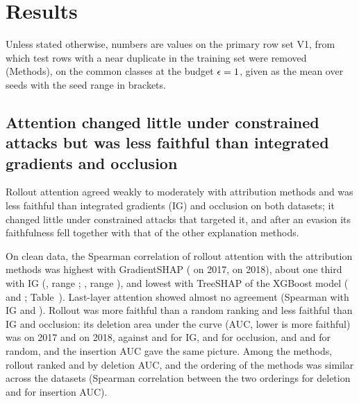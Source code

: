 \section*{Results}
\label{sec:results}

Unless stated otherwise, numbers are values on the primary row set V1, from which test rows with a near duplicate in
the training set were removed (Methods), on the \nCommonClasses{} common classes at the budget
$\epsilon = 1$, given as the mean over \nSeeds{} seeds with the seed range in brackets.

\subsection*{Attention changed little under constrained attacks but was less faithful than integrated gradients and
occlusion}
\label{sec:rq1}
Rollout attention agreed weakly to moderately with attribution methods and was less faithful than integrated gradients
(IG) and occlusion on both datasets; it changed little under constrained attacks that targeted it, and after an evasion
its faithfulness fell together with that of the other explanation methods.

On clean data, the Spearman correlation of rollout attention with the attribution methods was highest with
GradientSHAP (\spRolloutGShapVoneSeventeen{} on 2017, \spRolloutGShapVoneEighteen{} on 2018), about one third with IG
(\spRolloutIGVoneSeventeen{}, range \spRolloutIGVoneSeventeenRange; \spRolloutIGVoneEighteen{}, range
\spRolloutIGVoneEighteenRange), and lowest with TreeSHAP of the XGBoost model (\spRolloutTreeShapVoneSeventeen{} and
\spRolloutTreeShapVoneEighteen; Table~\mainTabClean).
Last-layer attention showed almost no agreement (Spearman with IG \spLastIGVoneSeventeen{} and \spLastIGVoneEighteen).
Rollout was more faithful than a random ranking and less faithful than IG and occlusion: its deletion area under the
curve (AUC, lower is more faithful) was \aucDelRolloutVoneSeventeen{} on 2017 and \aucDelRolloutVoneEighteen{} on 2018,
against \aucDelIGVoneSeventeen{} and \aucDelIGVoneEighteen{} for IG, \aucDelOcclVoneSeventeen{} and
\aucDelOcclVoneEighteen{} for occlusion, and \aucDelRandomVoneSeventeen{} and \aucDelRandomVoneEighteen{} for random,
and the insertion AUC gave the same picture.
Among the \nMethods{} methods, rollout ranked \rankDelRolloutSeventeen{} and \rankDelRolloutEighteen{} by deletion AUC,
and the ordering of the methods was similar across the datasets (Spearman correlation between the two orderings
\ordSpDelVone{} for deletion and \ordSpInsVone{} for insertion AUC).

